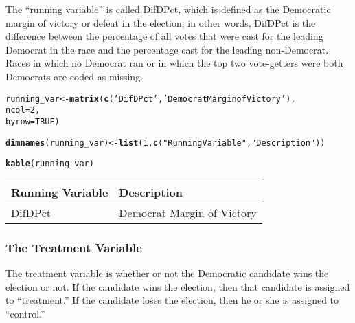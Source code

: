 \documentclass[11pt,leqno]{article}\usepackage[]{graphicx}\usepackage[]{color}
\makeatletter
\newcommand{\hlnum}[1]{\textcolor[rgb]{0.686,0.059,0.569}{#1}}%
\newcommand{\hlstr}[1]{\textcolor[rgb]{0.192,0.494,0.8}{#1}}%
\newcommand{\hlstd}[1]{\textcolor[rgb]{0.345,0.345,0.345}{#1}}%
\newcommand{\hlkwb}[1]{\textcolor[rgb]{0.69,0.353,0.396}{#1}}%
\newcommand{\hlkwc}[1]{\textcolor[rgb]{0.333,0.667,0.333}{#1}}%
\newcommand{\hlkwd}[1]{\textcolor[rgb]{0.737,0.353,0.396}{\textbf{#1}}}%
\newenvironment{kframe}{%
 \def\at@end@of@kframe{}%
 \ifinner\ifhmode%
  \def\at@end@of@kframe{\end{minipage}}%
  \begin{minipage}{\columnwidth}%
 \fi\fi%
 \def\FrameCommand##1{\hskip\@totalleftmargin \hskip-\fboxsep
 \colorbox{shadecolor}{##1}\hskip-\fboxsep
     \hskip-\linewidth \hskip-\@totalleftmargin \hskip\columnwidth}%
 \MakeFramed {\advance\hsize-\width
   \@totalleftmargin\z@ \linewidth\hsize
   \@setminipage}}%
 {\par\unskip\endMakeFramed%
 \at@end@of@kframe}
\newenvironment{knitrout}{}{} %
\theoremstyle{newstyle}
\makeatother
\begin{document}
The ``running variable'' is called DifDPct, which is defined as the Democratic margin of victory or defeat in the election; in other words, DifDPct is the difference between the percentage of all votes that were cast for the leading Democrat in the race and the percentage cast for the leading non-Democrat. Races in which no Democrat ran or in which the top two vote-getters were both Democrats are coded as missing.

\begin{knitrout}\footnotesize
{}\color{fgcolor}\begin{kframe}
\begin{alltt}
\hlstd{running_var} \hlkwb{<-} \hlkwd{matrix}\hlstd{(}\hlkwd{c}\hlstd{(}\hlstr{'DifDPct'}\hlstd{,} \hlstr{'Democrat Margin of Victory'}\hlstd{),}
              \hlkwc{ncol} \hlstd{=} \hlnum{2}\hlstd{,}
              \hlkwc{byrow} \hlstd{=} \hlnum{TRUE}\hlstd{)}

\hlkwd{dimnames}\hlstd{(running_var)} \hlkwb{<-} \hlkwd{list}\hlstd{(}\hlnum{1}\hlstd{,} \hlkwd{c}\hlstd{(}\hlstr{"Running Variable"}\hlstd{,} \hlstr{"Description"}\hlstd{))}

\hlkwd{kable}\hlstd{(running_var)}
\end{alltt}
\end{kframe}
\begin{tabular}{l|l}
\hline
Running Variable & Description\\
\hline
DifDPct & Democrat Margin of Victory\\
\hline
\end{tabular}


\end{knitrout}

\subsubsection{The Treatment Variable}

The treatment variable is whether or not the Democratic candidate wins the election or not. If the candidate wins the election, then that candidate is assigned to ``treatment.'' If the candidate loses the election, then he or she is assigned to ``control.''
\end{document}
